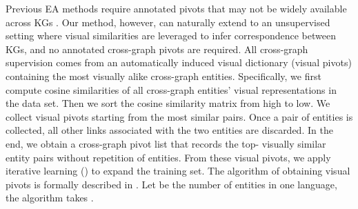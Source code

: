 \documentclass[letterpaper]{article} \usepackage{aaai21}  \usepackage{times}  \usepackage{helvet} \usepackage{courier}  \usepackage[hyphens]{url}  \usepackage{graphicx} \urlstyle{rm} \def\UrlFont{\rm}  \usepackage{natbib}  \usepackage{caption} \frenchspacing  \setlength{\pdfpagewidth}{8.5in}  \setlength{\pdfpageheight}{11in}
\begin{document}
Previous EA methods require annotated pivots that may not be widely available across KGs \cite{zhuang2017hike,chen2017multigraph}. Our method, however, can naturally extend to an unsupervised setting where visual similarities are leveraged to infer correspondence between KGs, and no annotated cross-graph pivots are required. 
All cross-graph supervision comes from an automatically induced visual dictionary (visual pivots) containing the most visually alike cross-graph entities. Specifically, we first compute cosine similarities of all cross-graph entities' visual representations in the data set. Then we sort the cosine similarity matrix from high to low. We collect visual pivots starting from the most similar pairs. Once a pair of entities is collected, all other links associated with the two entities are discarded. In the end, we obtain a cross-graph pivot list that records the top- visually similar entity pairs without repetition of entities. From these visual pivots, we apply iterative learning () to expand the training set. The algorithm of obtaining visual pivots is formally described in . Let  be the number of entities in one language, the algorithm takes . 
\end{document}
